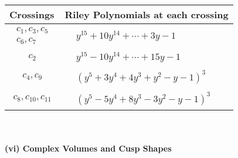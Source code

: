 \documentclass[1p]{elsarticle_modified}
\theoremstyle{definition}
\begin{document}
\begin{tabular}{m{50pt}|m{274pt}}
Crossings & \hspace{64pt}Riley Polynomials at each crossing \\
\hline $$\begin{aligned}c_{1},c_{3},c_{5}\\c_{6},c_{7}\end{aligned}$$&$\begin{aligned}
&y^{15}+10 y^{14}+\cdots+3 y-1
\end{aligned}$\\
\hline $$\begin{aligned}c_{2}\end{aligned}$$&$\begin{aligned}
&y^{15}-10 y^{14}+\cdots+15 y-1
\end{aligned}$\\
\hline $$\begin{aligned}c_{4},c_{9}\end{aligned}$$&$\begin{aligned}
&(y^5+3 y^4+4 y^3+y^2- y-1)^3
\end{aligned}$\\
\hline $$\begin{aligned}c_{8},c_{10},c_{11}\end{aligned}$$&$\begin{aligned}
&(y^5-5 y^4+8 y^3-3 y^2- y-1)^3
\end{aligned}$\\
\hline
\end{tabular}\\~\\
\newpage\flushleft \textbf{(vi) Complex Volumes and Cusp Shapes}
\end{document}
